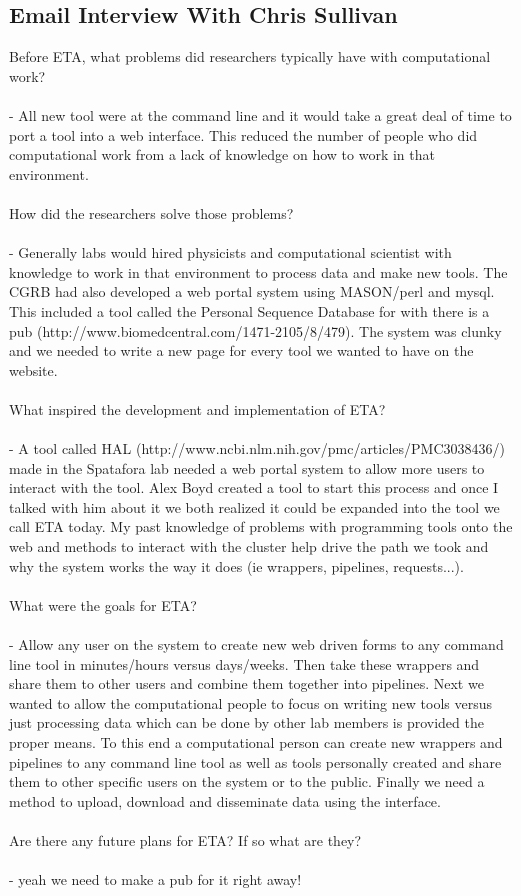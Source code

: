 \documentclass[a4paper,12pt]{article}
\begin{document}
\subsection{Email Interview With Chris Sullivan}


Before ETA, what problems did researchers typically have with computational work?\\\\
- All new tool were at the command line and it would take a great deal of time to port a tool into a web interface. This reduced the number of people who did computational work from a lack of knowledge on how to work in that environment.\\\\


How did the researchers solve those problems?\\\\

- Generally labs would hired physicists and computational scientist with knowledge to work in that environment to process data and make new tools. The CGRB had also developed a web portal system using MASON/perl and mysql. This included a tool called the Personal Sequence Database for with there is a pub (http://www.biomedcentral.com/1471-2105/8/479). The system was clunky and we needed to write a new page for every tool we wanted to have on the website.\\\\


What inspired the development and implementation of ETA?\\\\
- A tool called HAL (http://www.ncbi.nlm.nih.gov/pmc/articles/PMC3038436/) made in the Spatafora lab needed a web portal system to allow more users to interact with the tool. Alex Boyd created a tool to start this process and once I talked with him about it we both realized it could be expanded into the tool we call ETA today. My past knowledge of problems with programming tools onto the web and methods to interact with the cluster help drive the path we took and why the system works the way it does (ie wrappers, pipelines, requests...).
\\\\

What were the goals for ETA?\\\\
- Allow any user on the system to create new web driven forms to any command line tool in minutes/hours versus days/weeks. Then take these wrappers and share them to other users and combine them together into pipelines. Next we wanted to allow the computational people to focus on writing new tools versus just processing data which can be done by other lab members is provided the proper means. To this end a computational person can create new wrappers and pipelines to any command line tool as well as tools personally created and share them to other specific users on the system or to the public. Finally we need a method to upload, download and disseminate data using the interface.
\\\\

Are there any future plans for ETA? If so what are they?\\\\

- yeah we need to make a pub for it right away!\\\\
\end{document}
